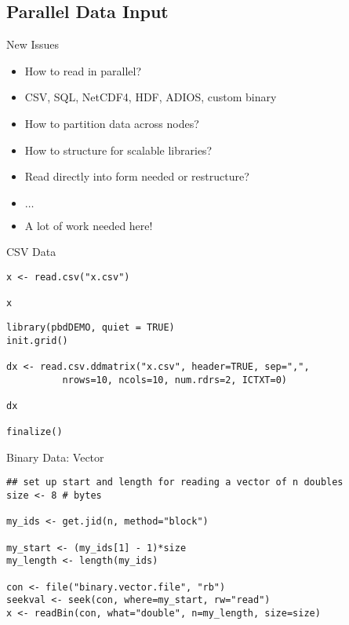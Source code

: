 \subsection{Parallel Data Input}
\makesubcontentsslidessec


\begin{frame}
  \begin{block}{New Issues}\pause
    \begin{itemize}
    \item How to read in parallel?
    \item CSV, SQL, NetCDF4, HDF, ADIOS, custom binary
    \item How to partition data across nodes?
    \item How to structure for scalable libraries?
    \item Read directly into form needed or restructure?
    \item $\ldots$
    \item A lot of work needed here!
    \end{itemize}
  \end{block}
\end{frame}



\begin{frame}[fragile]
  \begin{exampleblock}{CSV Data}\pause
\begin{lstlisting}[title=Serial Code]
x <- read.csv("x.csv")

x
\end{lstlisting}

\begin{lstlisting}[title=Parallel Code]
library(pbdDEMO, quiet = TRUE)
init.grid()

dx <- read.csv.ddmatrix("x.csv", header=TRUE, sep=",", 
          nrows=10, ncols=10, num.rdrs=2, ICTXT=0)

dx

finalize()
\end{lstlisting}
  \end{exampleblock}
\end{frame}

\begin{frame}[fragile]
  \begin{exampleblock}{Binary Data: Vector}\pause
    \begin{lstlisting}
## set up start and length for reading a vector of n doubles
size <- 8 # bytes

my_ids <- get.jid(n, method="block")

my_start <- (my_ids[1] - 1)*size
my_length <- length(my_ids)

con <- file("binary.vector.file", "rb")
seekval <- seek(con, where=my_start, rw="read")
x <- readBin(con, what="double", n=my_length, size=size)
    \end{lstlisting}
  \end{exampleblock}
\end{frame}

